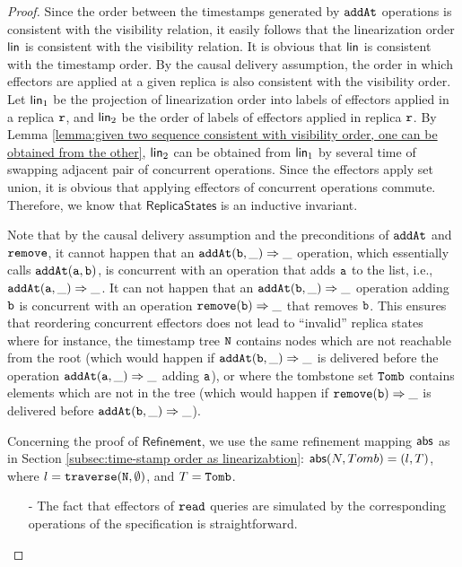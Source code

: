 \begin {proof} 

Since the order between the timestamps generated by ${\tt addAt}$ operations is consistent with the visibility relation, it easily follows that the linearization order $\mathsf{lin}$ is consistent with the visibility relation. It is obvious that $\mathsf{lin}$ is consistent with the timestamp order. By the causal delivery assumption, the order in which effectors are applied at a given replica is also consistent with the visibility order. Let $\mathsf{lin}_1$ be the projection of linearization order into labels of effectors applied in a replica $\mathtt{r}$, and $\mathsf{lin}_2$ be the order of labels of effectors applied in replica $\mathtt{r}$. By Lemma \ref{lemma:given two sequence consistent with visibility order, one can be obtained from the other}, $\mathsf{lin}_2$ can be obtained from $\mathsf{lin}_1$ by several time of swapping adjacent pair of concurrent operations. Since the effectors apply set union, it is obvious that applying effectors of concurrent operations commute. Therefore, we know that $\mathsf{ReplicaStates}$ is an inductive invariant. 

Note that by the causal delivery assumption and the preconditions of ${\tt addAt}$ and ${\tt remove}$, it cannot happen that an $\alabellong[{\tt addAt}]{b,\_}{\_}{}$ operation, which essentially calls $\alabelshort[{\tt addAt}]{a,b}$, is concurrent with an operation that adds ${\tt a}$ to the list, i.e., $\alabellong[{\tt addAt}]{a,\_}{\_}{}$. It can not happen that an $\alabellong[{\tt addAt}]{b,\_}{\_}{}$ operation adding ${\tt b}$ is concurrent with an operation $\alabellong[{\tt remove}]{b}{\_}{}$ that removes ${\tt b}$. This ensures that reordering
concurrent effectors does not lead to ``invalid'' replica states where for instance, the timestamp tree ${\tt N}$ contains nodes which are not reachable from the root (which would happen if $\alabellong[{\tt addAt}]{b,\_}{\_}{}$ is delivered before the operation $\alabellong[{\tt addAt}]{a,\_}{\_}{}$ adding ${\tt a}$), or where the tombstone set ${\tt Tomb}$ contains elements which are not in the tree (which would happen if $\alabellong[{\tt remove}]{b}{\_}{}$ is delivered before $\alabellong[{\tt addAt}]{b,\_}{\_}{}$). 

Concerning the proof of $\mathsf{Refinement}$, we use the same refinement mapping $\mathsf{abs}$ as in Section \ref{subsec:time-stamp order as linearizabtion}: $\mathsf{abs}(N,Tomb) = (l,T)$, where $l={\tt traverse(N, \emptyset)}$, and $T={\tt Tomb}$. 

\begin{itemize}
\setlength{\itemsep}{0.5pt}
\item[-] The fact that effectors of ${\tt read}$ queries are simulated by the corresponding operations of the specification is straightforward.


\end{itemize}
\end{proof}
